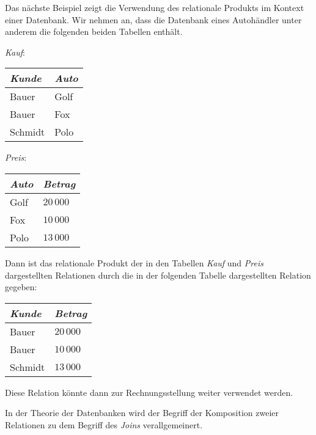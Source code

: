 \example
Das n\"{a}chste Beispiel zeigt die Verwendung des relationale Produkts im Kontext einer
Datenbank.  Wir nehmen an, dass die Datenbank eines Autoh\"{a}ndler unter anderem die
folgenden beiden Tabellen enth\"{a}lt.
\begin{center}
\textsl{Kauf}:  \begin{tabular}[t]{|l|l|}
\hline
\textsl{Kunde} & \textsl{Auto} \\
\hline
\hline
  Bauer   & Golf \\
\hline
  Bauer   & Fox  \\
\hline
  Schmidt & Polo \\
\hline
  \end{tabular}
\qquad \textsl{Preis}:
  \begin{tabular}[t]{|l|l|}
\hline
\textsl{Auto} & \textsl{Betrag} \\
\hline
\hline
  Golf    & $20\,000$ \\
\hline
  Fox     & $10\,000$ \\
\hline
  Polo    & $13\,000$ \\
\hline
  \end{tabular}
\end{center}
Dann ist das relationale Produkt der in den Tabellen \textsl{Kauf} und \textsl{Preis}
dargestellten Relationen durch die in der folgenden Tabelle dargestellten Relation
gegeben:

\begin{center}
  \begin{tabular}[t]{|l|l|}
\hline
\textsl{Kunde} & \textsl{Betrag} \\
\hline
\hline
  Bauer   & $20\,000$ \\
\hline
  Bauer   & $10\,000$ \\
\hline
  Schmidt & $13\,000$ \\
\hline
  \end{tabular} 
\end{center}
Diese Relation k\"{o}nnte dann zur Rechnungsstellung weiter verwendet werden. \eox
\vspace{0.2cm}

\remark
In der Theorie der Datenbanken wird der Begriff der Komposition zweier
Relationen zu dem Begriff des \emph{Joins} verallgemeinert.
\eox

